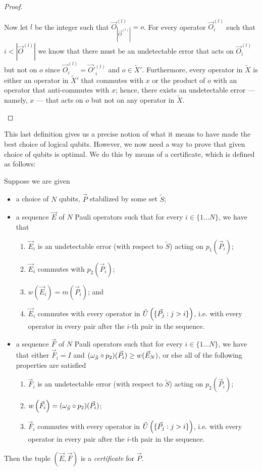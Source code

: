 \documentclass[twocolumn,showpacs,preprintnumbers,amsmath,amssymb,nofootinbib,pra,floatfix]{revtex4-1}
\newenvironment{definition}[1][Definition]{\begin{trivlist}
\item[\hskip \labelsep {\bfseries #1}]}{\end{trivlist}}
\newcommand{\lst}{\vec}
\newcommand{\set}{\tilde}
\begin{document}
\begin{proof}
\begin{description}
\begin{enumerate}
Now let $l$ be the integer such that $\lst O^{(l)}_{|\lst O^{(l)}|}=o$.  For every operator $\lst O^{(l)}_i$ such that $i<|\lst O^{(l)}|$ we know that there must be an undetectable error that acts on $\lst O^{(l)}_i$ but not on $o$ since $\lst O^{(l)}_i=\lst O'^{(l)}_i$ and $o\in \set X'$.  Furthermore, every operator in $\set X$ is either an operator in $\set X'$ that commutes with $x$ or the product of $o$ with an operator that anti-commutes with $x$;  hence, there exists an undetectable error --- namely, $x$ --- that acts on $o$ but not on any operator in $\set X$.
\end{enumerate}
\end{description}

\end{proof}
This last definition gives us a precise notion of what it means to have made the best choice of logical qubits.  However, we now need a way to prove that given choice of qubits is optimal.  We do this by means of a certificate, which is defined as follows:

\begin{definition}
Suppose we are given
\begin{itemize}
\item a choice of $N$ qubits, $\lst P$ stabilized by some set $\set S$;
\item a sequence $\lst E$ of $N$ Pauli operators such that for every $i\in\{1\dots N\}$, we have that
\begin{enumerate}
\item $\lst E_i$ is an undetectable error (with respect to $\set S$) acting on $p_1(\lst P_i)$;
\item $\lst E_i$ commutes with $p_2(\lst P_i)$;
\item $w(\lst E_i)=m(\lst P_i)$; and
\item $\lst E_i$ commutes with every operator in $\set U\paren{\{\lst P_j:j>i\}}$, i.e. with every operator in every pair after the $i$-th pair in the sequence.
\end{enumerate}
\item a sequence $\lst F$ of $N$ Pauli operators such that for every $i\in\{1\dots N\}$, we have that either $\lst F_i=I$ and $(\om_{\set S} \circ p_2)(\lst P_i) \ge w(\lst E_N)$, or else all of the following properties are satisfied
\begin{enumerate}
\item $\lst F_i$ is an undetectable error (with respect to $\set S$) acting on $p_2(\lst P_i)$;
\item $w\paren{\lst F_i}=(\om_{\set S} \circ p_2)(\lst P_i)$;
\item $\lst F_i$ commutes with every operator in $\set U\paren{\{\lst P_j:j>i\}}$, i.e. with every operator in every pair after the $i$-th pair in the sequence.
\end{enumerate}
\end{itemize}
Then the tuple $(\lst E,\lst F)$ is a \emph{certificate} for $\lst P$.
\end{definition}
\end{document}
